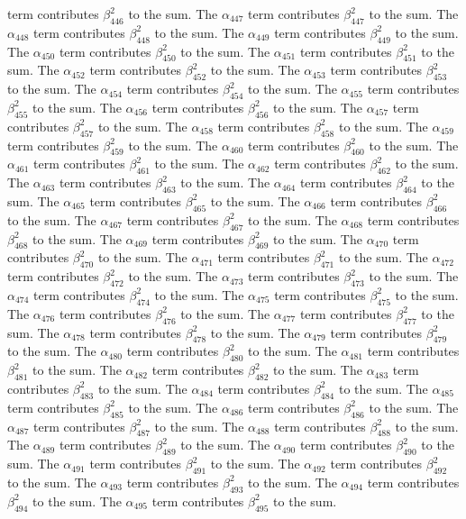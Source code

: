 \begin{lemma}
term contributes $\beta_{446}^{2}$ to the sum. The $\alpha_{447}$ term contributes $\beta_{447}^{2}$ to the sum. The $\alpha_{448}$ term contributes $\beta_{448}^{2}$ to the sum. The $\alpha_{449}$ term contributes $\beta_{449}^{2}$ to the sum. The $\alpha_{450}$ term contributes $\beta_{450}^{2}$ to the sum. The $\alpha_{451}$ term contributes $\beta_{451}^{2}$ to the sum. The $\alpha_{452}$ term contributes $\beta_{452}^{2}$ to the sum. The $\alpha_{453}$ term contributes $\beta_{453}^{2}$ to the sum. The $\alpha_{454}$ term contributes $\beta_{454}^{2}$ to the sum. The $\alpha_{455}$ term contributes $\beta_{455}^{2}$ to the sum. The $\alpha_{456}$ term contributes $\beta_{456}^{2}$ to the sum. The $\alpha_{457}$ term contributes $\beta_{457}^{2}$ to the sum. The $\alpha_{458}$ term contributes $\beta_{458}^{2}$ to the sum. The $\alpha_{459}$ term contributes $\beta_{459}^{2}$ to the sum. The $\alpha_{460}$ term contributes $\beta_{460}^{2}$ to the sum. The $\alpha_{461}$ term contributes $\beta_{461}^{2}$ to the sum. The $\alpha_{462}$ term contributes $\beta_{462}^{2}$ to the sum. The $\alpha_{463}$ term contributes $\beta_{463}^{2}$ to the sum. The $\alpha_{464}$ term contributes $\beta_{464}^{2}$ to the sum. The $\alpha_{465}$ term contributes $\beta_{465}^{2}$ to the sum. The $\alpha_{466}$ term contributes $\beta_{466}^{2}$ to the sum. The $\alpha_{467}$ term contributes $\beta_{467}^{2}$ to the sum. The $\alpha_{468}$ term contributes $\beta_{468}^{2}$ to the sum. The $\alpha_{469}$ term contributes $\beta_{469}^{2}$ to the sum. The $\alpha_{470}$ term contributes $\beta_{470}^{2}$ to the sum. The $\alpha_{471}$ term contributes $\beta_{471}^{2}$ to the sum. The $\alpha_{472}$ term contributes $\beta_{472}^{2}$ to the sum. The $\alpha_{473}$ term contributes $\beta_{473}^{2}$ to the sum. The $\alpha_{474}$ term contributes $\beta_{474}^{2}$ to the sum. The $\alpha_{475}$ term contributes $\beta_{475}^{2}$ to the sum. The $\alpha_{476}$ term contributes $\beta_{476}^{2}$ to the sum. The $\alpha_{477}$ term contributes $\beta_{477}^{2}$ to the sum. The $\alpha_{478}$ term contributes $\beta_{478}^{2}$ to the sum. The $\alpha_{479}$ term contributes $\beta_{479}^{2}$ to the sum. The $\alpha_{480}$ term contributes $\beta_{480}^{2}$ to the sum. The $\alpha_{481}$ term contributes $\beta_{481}^{2}$ to the sum. The $\alpha_{482}$ term contributes $\beta_{482}^{2}$ to the sum. The $\alpha_{483}$ term contributes $\beta_{483}^{2}$ to the sum. The $\alpha_{484}$ term contributes $\beta_{484}^{2}$ to the sum. The $\alpha_{485}$ term contributes $\beta_{485}^{2}$ to the sum. The $\alpha_{486}$ term contributes $\beta_{486}^{2}$ to the sum. The $\alpha_{487}$ term contributes $\beta_{487}^{2}$ to the sum. The $\alpha_{488}$ term contributes $\beta_{488}^{2}$ to the sum. The $\alpha_{489}$ term contributes $\beta_{489}^{2}$ to the sum. The $\alpha_{490}$ term contributes $\beta_{490}^{2}$ to the sum. The $\alpha_{491}$ term contributes $\beta_{491}^{2}$ to the sum. The $\alpha_{492}$ term contributes $\beta_{492}^{2}$ to the sum. The $\alpha_{493}$ term contributes $\beta_{493}^{2}$ to the sum. The $\alpha_{494}$ term contributes $\beta_{494}^{2}$ to the sum. The $\alpha_{495}$ term contributes $\beta_{495}^{2}$ to the sum. 
\end{lemma}
